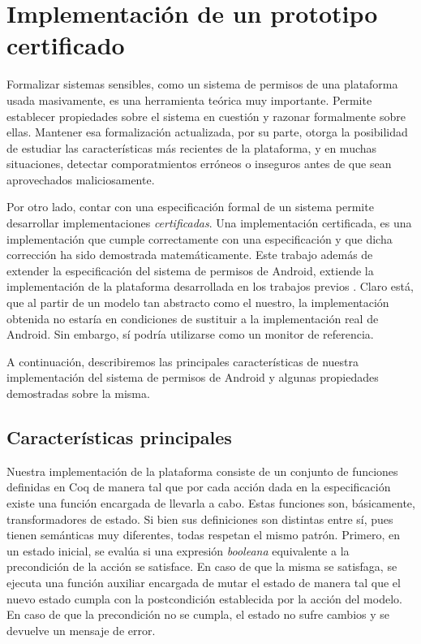 \chapter{Implementación de un prototipo certificado}
\label{chapter:implementation}
Formalizar sistemas sensibles, como un sistema de permisos de una plataforma usada masivamente, es
una herramienta teórica muy importante. Permite establecer propiedades sobre el sistema en cuestión
y razonar formalmente sobre ellas. Mantener esa formalización actualizada, por su parte, otorga la
posibilidad de estudiar las características más recientes de la plataforma, y en muchas situaciones,
detectar comporatmientos erróneos o inseguros antes de que sean aprovechados maliciosamente.

Por otro lado, contar con una especificación formal de un sistema permite desarrollar
implementaciones \textit{certificadas}. Una implementación certificada, es una implementación que
cumple correctamente con una especificación y que dicha corrección ha sido demostrada
matemáticamente. Este trabajo además de extender la especificación del sistema de permisos de
Android, extiende la implementación de la plataforma desarrollada en los trabajos previos
\cite{betarte-2017,luna-cleiej}. Claro está, que al partir de un modelo tan abstracto como el
nuestro, la implementación obtenida no estaría en condiciones de sustituir a la implementación real
de Android. Sin embargo, sí podría utilizarse como un monitor de referencia\cite{Anderson:1972}.

A continuación, describiremos las principales características de nuestra implementación del sistema
de permisos de Android y algunas propiedades demostradas sobre la misma.

\section{Características principales}
Nuestra implementación de la plataforma consiste de un conjunto de funciones definidas en Coq de
manera tal que por cada acción dada en la especificación existe una función encargada de llevarla a
cabo. Estas funciones son, básicamente, transformadores de estado. Si bien sus definiciones son
distintas entre sí, pues tienen semánticas muy diferentes, todas respetan el mismo patrón. Primero,
en un estado inicial, se evalúa si una expresión \textit{booleana} equivalente a la precondición de
la acción se satisface. En caso de que la misma se satisfaga, se ejecuta una función auxiliar
encargada de mutar el estado de manera tal que el nuevo estado cumpla con la postcondición
establecida por la acción del modelo. En caso de que la precondición no se cumpla, el estado no
sufre cambios y se devuelve un mensaje de error.


